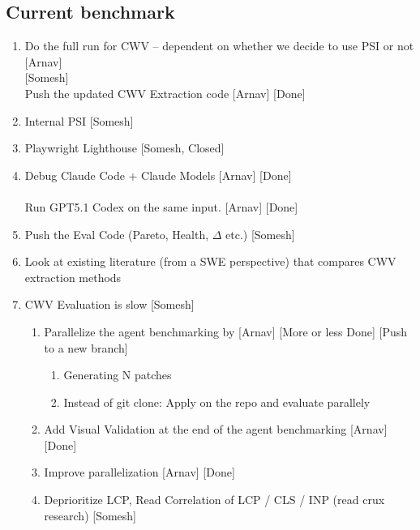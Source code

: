 \subsection{Current benchmark}
\begin{enumerate}
    \item Do the full run for CWV -- dependent on whether we decide to use PSI or not [Arnav]\\
     [Somesh]\\
    Push the updated CWV Extraction code [Arnav] [Done]
    \item Internal PSI [Somesh] 
    \item Playwright Lighthouse [Somesh, Closed]
    \item Debug Claude Code + Claude Models [Arnav] [Done]\\ 
    \\
    Run GPT5.1 Codex on the same input. [Arnav] [Done]
    \item Push the Eval Code (Pareto, Health, $\Delta$ etc.) [Somesh]
    \item Look at existing literature (from a SWE perspective) that compares CWV extraction methods
    \item CWV Evaluation is slow [Somesh]
    \begin{enumerate}
        \item Parallelize the agent benchmarking by [Arnav] [More or less Done] [Push to a new branch]
        \begin{enumerate}
            \item Generating N patches
            \item Instead of git clone: Apply on the repo and evaluate parallely
        \end{enumerate}
        \item Add Visual Validation at the end of the agent benchmarking [Arnav] [Done]
        \item Improve parallelization [Arnav] [Done]\\
        \item Deprioritize LCP, Read Correlation of LCP / CLS / INP (read crux research) [Somesh]

\end{enumerate}
\end{enumerate}
